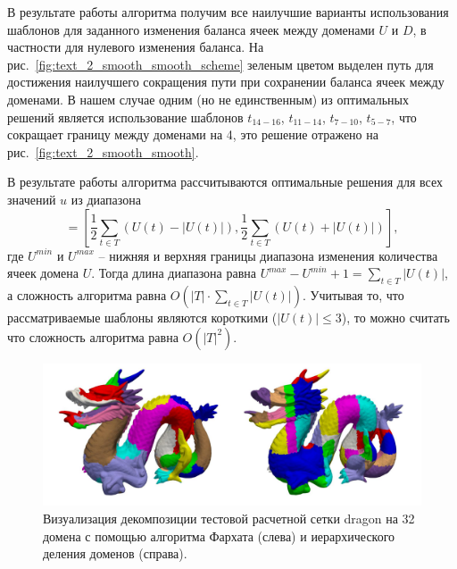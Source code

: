 В результате работы алгоритма получим все наилучшие варианты использования шаблонов для заданного изменения баланса ячеек между доменами $U$ и $D$, в частности для нулевого изменения баланса.
На рис.~\ref{fig:text_2_smooth_smooth_scheme} зеленым цветом выделен путь для достижения наилучшего сокращения пути при сохранении баланса ячеек между доменами.
В нашем случае одним (но не единственным) из оптимальных решений является использование шаблонов $t_{14-16}$, $t_{11-14}$, $t_{7-10}$, $t_{5-7}$, что сокращает границу между доменами на 4, это решение отражено на рис.~\ref{fig:text_2_smooth_smooth}.

В результате работы алгоритма рассчитываются оптимальные решения для всех значений $u$ из диапазона
\begin{equation}
	[U^{min}, U^{max}] = \left[ \frac{1}{2} \sum_{t \in T}{(U(t) - |U(t)|)}, \frac{1}{2} \sum_{t \in T}{(U(t) + |U(t)|)} \right],
\end{equation}
где $U^{min}$ и $U^{max}$ -- нижняя и верхняя границы диапазона изменения количества ячеек домена $U$.
Тогда длина диапазона равна $U^{max} - U^{min} + 1 = \sum_{t \in T}{|U(t)|}$, а сложность алгоритма равна $O \left( |T| \cdot \sum_{t \in T}{|U(t)|} \right)$.
Учитывая то, что рассматриваемые шаблоны являются короткими ($|U(t)| \le 3$), то можно считать что сложность алгоритма равна $O(|T|^2)$.

\begin{figure}[ht]
\centering
\includegraphics[width=1.0\textwidth]{fig/par_dragon_decomp.pdf}
\singlespacing
{}\caption{Визуализация декомпозиции тестовой расчетной сетки dragon на 32 домена с помощью алгоритма Фархата (слева) и иерархического деления доменов (справа).}
\label{fig:text_2_smooth_decomp}
\end{figure}

